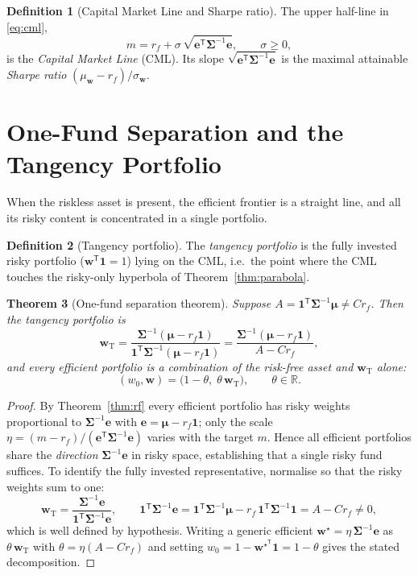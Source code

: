 \documentclass[11pt]{article}
\theoremstyle{definition}
\newtheorem{definition}{Definition}[section]
\theoremstyle{plain}
\newtheorem{theorem}[definition]{Theorem}
\newcommand{\R}{\mathbb{R}}
\newcommand{\one}{\mathbf{1}}
\newcommand{\bw}{\bm{w}}
\newcommand{\bmu}{\bm{\mu}}
\newcommand{\bSigma}{\bm{\Sigma}}
\newcommand{\T}{^{\mathsf{T}}}
\begin{document}
\begin{definition}[Capital Market Line and Sharpe ratio]
The upper half-line in \eqref{eq:cml},
\[
m = r_f + \sigma\, \sqrt{\bm{e}\T\bSigma^{-1}\bm{e}}, \qquad \sigma \ge 0,
\]
is the \emph{Capital Market Line} (CML). Its slope
$\sqrt{\bm{e}\T\bSigma^{-1}\bm{e}}$ is the maximal attainable
\emph{Sharpe ratio} $(\mu_{\bw} - r_f)/\sigma_{\bw}$.
\end{definition}

\section{One-Fund Separation and the Tangency Portfolio}

When the riskless asset is present, the efficient frontier is a straight line,
and all its risky content is concentrated in a single portfolio.

\begin{definition}[Tangency portfolio]
The \emph{tangency portfolio} is the fully invested risky portfolio
($\bw\T\one = 1$) lying on the CML, i.e.\ the point where the CML touches the
risky-only hyperbola of Theorem~\ref{thm:parabola}.
\end{definition}

\begin{theorem}[One-fund separation theorem]\label{thm:onefund}
Suppose $A = \one\T\bSigma^{-1}\bmu \ne C r_f$. Then the tangency portfolio is
\[
\bw_{\mathrm{T}}
= \frac{\bSigma^{-1}(\bmu - r_f\one)}{\one\T \bSigma^{-1}(\bmu - r_f\one)}
= \frac{\bSigma^{-1}(\bmu - r_f\one)}{A - C r_f},
\]
and every efficient portfolio is a combination of the risk-free asset and
$\bw_{\mathrm{T}}$ alone:
\[
(w_0, \bw) = \big(1 - \theta,\; \theta\, \bw_{\mathrm{T}}\big),
\qquad \theta \in \R .
\]
\end{theorem}

\begin{proof}
By Theorem~\ref{thm:rf} every efficient portfolio has risky weights proportional
to $\bSigma^{-1}\bm{e}$ with $\bm{e} = \bmu - r_f\one$; only the scale
$\eta = (m-r_f)/(\bm{e}\T\bSigma^{-1}\bm{e})$ varies with the target $m$. Hence
all efficient portfolios share the \emph{direction} $\bSigma^{-1}\bm{e}$ in
risky space, establishing that a single risky fund suffices. To identify the
fully invested representative, normalise so that the risky weights sum to one:
\[
\bw_{\mathrm{T}} = \frac{\bSigma^{-1}\bm{e}}{\one\T\bSigma^{-1}\bm{e}},
\qquad
\one\T\bSigma^{-1}\bm{e}
= \one\T\bSigma^{-1}\bmu - r_f\,\one\T\bSigma^{-1}\one
= A - C r_f \ne 0 ,
\]
which is well defined by hypothesis. Writing a generic efficient
$\bw^\star = \eta\,\bSigma^{-1}\bm{e}$ as
$\theta\,\bw_{\mathrm{T}}$ with $\theta = \eta(A - Cr_f)$ and setting
$w_0 = 1 - \bw^{\star\T}\one = 1 - \theta$ gives the stated decomposition.
\end{proof}
\end{document}
